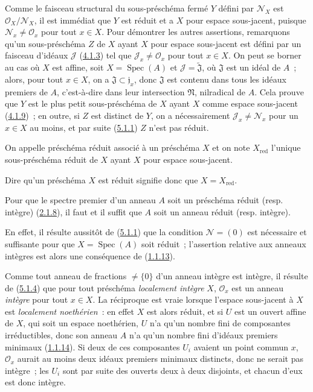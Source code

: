 Comme le faisceau structural du sous-préschéma fermé $Y$ défini par
$\mathscr{N}_X$ est $\mathscr{O}_X/\mathscr{N}_X$, il est immédiat que $Y$
est réduit et a $X$ pour espace sous-jacent, puisque
$\mathscr{N}_x\ne\mathscr{O}_x$ pour tout $x\in X$. Pour démontrer les autres
assertions, remarquons qu'un sous-préschéma $Z$ de $X$ ayant $X$ pour espace
sous-jacent est défini par un faisceau d'idéaux $\mathscr{J}$
(\hyperref[I.4.1.3-fr]{4.1.3}) tel que
$\mathscr{J}_x\ne\mathscr{O}_x$ pour tout $x\in X$. On peut se borner au cas
où $X$ est affine, soit $X=\operatorname{Spec}(A)$ et
$\mathscr{J}=\widetilde{\mathfrak{J}}$, où $\mathfrak{J}$ est un idéal de
$A$~; alors, pour tout $x\in X$, on a
$\mathfrak{J}\subset\mathfrak{j}_x$, donc $\mathfrak{J}$ est contenu dans
tous les idéaux premiers de $A$, c'est-à-dire dans leur intersection
$\mathfrak{N}$, nilradical de $A$. Cela prouve que $Y$ est le plus petit
sous-préschéma de $X$ ayant $X$ comme espace sous-jacent
(\hyperref[I.4.1.9-fr]{4.1.9})~; en outre, si $Z$ est distinct de $Y$, on a
nécessairement $\mathscr{J}_x\ne\mathscr{N}_x$ pour un $x\in X$ au moins, et
par suite (\hyperref[I.5.1.1-fr]{5.1.1}) $Z$ n'est pas réduit.

\begin{definition}[5.1.3]
\label{I.5.1.3-fr}
On appelle préschéma réduit associé à un préschéma $X$ et on note
$X_{\mathrm{red}}$ l'unique sous-préschéma réduit de $X$ ayant $X$ pour
espace sous-jacent.
\end{definition}

Dire qu'un préschéma $X$ est réduit signifie donc que
$X=X_{\mathrm{red}}$.

\begin{proposition}[5.1.4]
\label{I.5.1.4-fr}
Pour que le spectre premier d'un anneau $A$ soit un préschéma réduit (\textup{resp.}
intègre) (\hyperref[I.2.1.8-fr]{2.1.8}), il faut et il suffit que $A$ soit un
anneau réduit (\textup{resp.} intègre).
\end{proposition}

En effet, il résulte aussitôt de (\hyperref[I.5.1.1-fr]{5.1.1}) que la
condition $\mathscr{N}=(0)$ est nécessaire et suffisante pour que
$X=\operatorname{Spec}(A)$ soit réduit~; l'assertion relative aux anneaux
intègres est alors une conséquence de
(\hyperref[I.1.1.13-fr]{1.1.13}).

Comme tout anneau de fractions $\ne\{0\}$ d'un anneau intègre est intègre, il
résulte de (\hyperref[I.5.1.4-fr]{5.1.4}) que pour tout préschéma
\emph{localement intègre} $X$, $\mathscr{O}_x$ est un anneau \emph{intègre}
pour tout $x\in X$. La réciproque est vraie lorsque l'espace sous-jacent à
$X$ est \emph{localement noethérien}~: en effet $X$ est alors réduit, et si
$U$ est un ouvert affine de $X$, qui soit un espace noethérien, $U$ n'a qu'un
nombre fini de composantes irréductibles, donc son anneau $A$ n'a qu'un
nombre fini d'idéaux premiers minimaux
(\hyperref[I.1.1.14-fr]{1.1.14}). Si deux de ces composantes $U_i$ avaient un
point commun $x$, $\mathscr{O}_x$ aurait au moins deux idéaux premiers
minimaux distincts, donc ne serait pas intègre~; les $U_i$ sont par suite des
ouverts deux à deux disjoints, et chacun d'eux est donc intègre.

